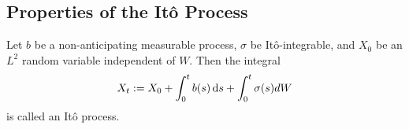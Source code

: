 

\subsection{Properties of the Itô Process}

\begin{definition}
  Let $b$ be a non-anticipating measurable process, $\sigma$ be Itô-integrable, and $X_0$ be an $L^2$ random variable independent of $W$. Then the integral
  $$X_t := X_0 + \int_0^t b(s) \,\mathrm{d} s + \int_0^t \sigma(s) dW$$
  is called an Itô process.
\end{definition}


